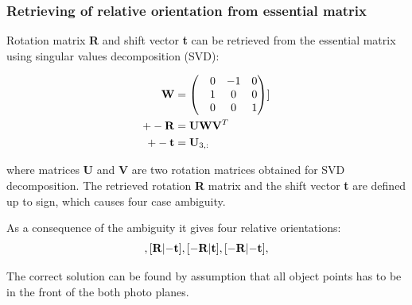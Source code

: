 \documentclass[a4paper,12pt]{article}
\newcommand{\ematr}[1]{
{\bf #1}
}
\newcommand{\evect}[1]{
{\bf #1}
}
\begin{document}
\subsubsection{Retrieving of relative orientation from essential matrix}
\label{sec:ess_eo}



Rotation matrix \ematr{R} and shift vector \evect{t} can be retrieved from the essential matrix using 
singular values decomposition (SVD):


\begin{equation}
\begin{split}
\ematr{W} &=
\begin{pmatrix}
& 0 & -1 & 0 \\
& 1 & 0 & 0 \\
& 0 & 0 & 1\\
\end{pmatrix}] \\
+- \ematr{R} &= \ematr{U}  \ematr{W} \ematr{V}^{T}\\
+- \evect{t} &= \evect{U}_{3,:}
\end{split}
\end{equation}

where matrices \ematr{U} and \ematr{V} are two rotation matrices  obtained for SVD decomposition.
The retrieved rotation \ematr{R} matrix and the shift vector \evect{t} are defined up to sign,
which causes four case ambiguity. 

As a consequence of the  ambiguity it gives four relative orientations: 
\begin{equation}
[\ematr{R}|\evect{t}],
[\ematr{R}|\evect{-t}],
[\ematr{-R}|\evect{t}],
[\ematr{-R}|\evect{-t}],
\end{equation}


The correct solution can be found   by assumption that all object points has to be in the front
of the both photo planes.
\end{document}
